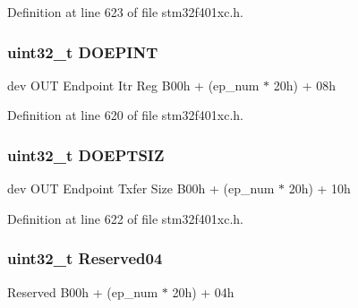 Definition at line 623 of file stm32f401xc.\+h.

\subsubsection[{\texorpdfstring{D\+O\+E\+P\+I\+NT}{DOEPINT}}]{ uint32\+\_\+t D\+O\+E\+P\+I\+NT}\hypertarget{struct_u_s_b___o_t_g___o_u_t_endpoint_type_def_affd2c6f534c8f2c252f3a93d0cd04ea2}{}\label{struct_u_s_b___o_t_g___o_u_t_endpoint_type_def_affd2c6f534c8f2c252f3a93d0cd04ea2}
dev O\+UT Endpoint Itr Reg B00h + (ep\+\_\+num $\ast$ 20h) + 08h 

Definition at line 620 of file stm32f401xc.\+h.

\subsubsection[{\texorpdfstring{D\+O\+E\+P\+T\+S\+IZ}{DOEPTSIZ}}]{ uint32\+\_\+t D\+O\+E\+P\+T\+S\+IZ}\hypertarget{struct_u_s_b___o_t_g___o_u_t_endpoint_type_def_a35b668314acbac2580b98caf8b9c5c10}{}\label{struct_u_s_b___o_t_g___o_u_t_endpoint_type_def_a35b668314acbac2580b98caf8b9c5c10}
dev O\+UT Endpoint Txfer Size B00h + (ep\+\_\+num $\ast$ 20h) + 10h 

Definition at line 622 of file stm32f401xc.\+h.

\subsubsection[{\texorpdfstring{Reserved04}{Reserved04}}]{\setlength{\rightskip}{0pt plus 5cm}uint32\+\_\+t Reserved04}\hypertarget{struct_u_s_b___o_t_g___o_u_t_endpoint_type_def_acfe7efaa61db86840767dff6d73f8695}{}\label{struct_u_s_b___o_t_g___o_u_t_endpoint_type_def_acfe7efaa61db86840767dff6d73f8695}
Reserved B00h + (ep\+\_\+num $\ast$ 20h) + 04h 

